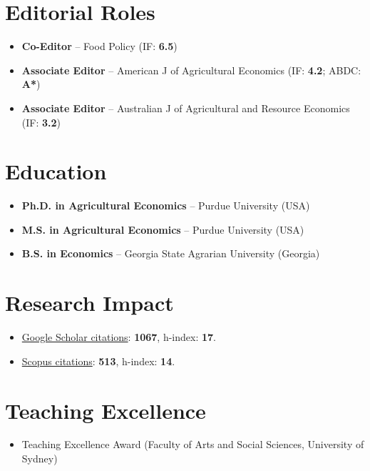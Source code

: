 \documentclass[10pt]{article}
\begin{document}
	\section*{Editorial Roles}
	\begin{itemize}
		\item {} \textbf{Co-Editor} -- Food Policy (IF: \textbf{6.5})
		\item {} \textbf{Associate Editor} -- American J of Agricultural Economics (IF: \textbf{4.2}; ABDC: \textbf{A*})
		\item {} \textbf{Associate Editor} -- Australian J of Agricultural and Resource Economics (IF: \textbf{3.2})
	\end{itemize}
	
	\section*{Education}
	\begin{itemize}
		\item {} \textbf{Ph.D. in Agricultural Economics} -- Purdue University (USA)
		\item {} \textbf{M.S. in Agricultural Economics} -- Purdue University (USA)
		\item {} \textbf{B.S. in Economics} -- Georgia State Agrarian University (Georgia)
	\end{itemize}
	
	\section*{Research Impact}
	\begin{itemize}
		\item \href{https://scholar.google.com/citations?user=VbNOr6wAAAAJ&hl=en}{Google Scholar citations}: \textbf{1067}, h-index: \textbf{17}.
		\item \href{https://www.scopus.com/authid/detail.uri?authorId=26421832000}{Scopus citations}: \textbf{513}, h-index: \textbf{14}.	
	\end{itemize}
	
	\section*{Teaching Excellence}
	\begin{itemize}
		\item {} Teaching Excellence Award (Faculty of Arts and Social Sciences, University of Sydney)
	\end{itemize}
	
\end{document}
